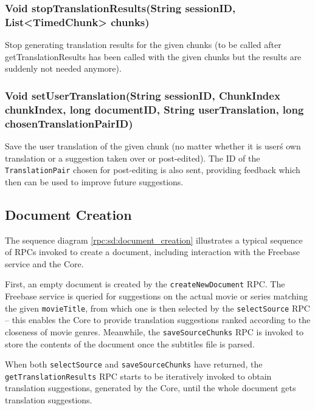\subsubsection{Void stopTranslationResults(String sessionID, List<TimedChunk> chunks)}
Stop generating translation results for the given chunks
(to be called after getTranslationResults has been called
with the given chunks but the results are suddenly not needed anymore).

\subsubsection{Void setUserTranslation(String sessionID, ChunkIndex chunkIndex, long documentID, String userTranslation, long chosenTranslationPairID)}
Save the user translation of the given chunk (no matter whether it is user\'s own translation or a suggestion taken over or post-edited).
The ID of the {\tt TranslationPair} chosen for post-editing is also sent, providing feedback which then can be used to improve future suggestions.

\subsection{Document Creation}

The sequence diagram \ref{rpc:sd:document_creation} illustrates a typical sequence of RPCs invoked to create a document, including interaction with the Freebase service and the Core.

First, an empty document is created by the {\tt createNewDocument} RPC. The Freebase service is queried for suggestions on the actual movie or series matching the given {\tt movieTitle}, from which one is then selected by the {\tt selectSource} RPC -- this enables the Core to provide translation suggestions ranked according to the closeness of movie genres. Meanwhile, the {\tt saveSourceChunks} RPC is invoked to store the contents of the document once the subtitles file is parsed.

When both {\tt selectSource} and {\tt saveSourceChunks} have returned, the {\tt getTranslationResults} RPC starts to be iteratively invoked to obtain translation suggestions, generated by the Core, until the whole document gets translation suggestions.

